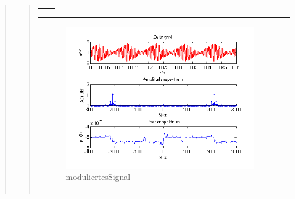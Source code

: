\begin{quote}
\begin{quote}
\begin{center}
\begin{tabular}{ll}
\begin{minipage}{0.67\textwidth}
            \end{minipage}
        
        \end{tabular}
        \end{center}
        
         \begin{center}
        \begin{tabular}{ll}
        
        \hspace{-5cm}
            \begin{minipage}{0.67\textwidth}
                
                \begin{figure}[H]
                    \label{fig:DemodreieckoT}
                    \includegraphics[scale=0.7]{Bilder/Am_Dre_2k_100Hz_mo}
                    \caption{moduliertesSignal}
                \end{figure}
        
            \end{minipage}
        

\end{tabular}
\end{center}
\end{quote}
\end{quote}

